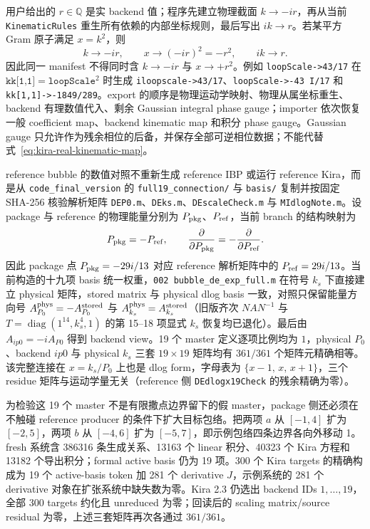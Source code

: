 ﻿\documentclass[a4paper,11pt]{article}
\begin{document}
用户给出的 $r\in\mathbb Q$ 是实 backend 值；程序先建立物理截面 $k\to-ir$，再从当前 \texttt{KinematicRules} 重生所有依赖的内部坐标规则，最后写出 $ik\to r$。若某平方 Gram 原子满足 $x=k^2$，则
\begin{equation}
 k\to-ir,\qquad x\to(-ir)^2=-r^2,\qquad ik\to r.
 \label{eq:kira-dependent-coordinate-section}
\end{equation}
因此同一 manifest 不得同时含 $k\to-ir$ 与 $x\to+r^2$。例如 \texttt{loopScale->43/17} 在 $\texttt{kk[1,1]}=\texttt{loopScale}^2$ 时生成 \texttt{iloopscale->43/17}、\texttt{loopScale->-43 I/17} 和 \texttt{kk[1,1]->-1849/289}。export 的顺序是物理运动学映射、物理从属坐标重生、backend 有理数值代入、剩余 Gaussian integral phase gauge；importer 依次恢复一般 coefficient map、backend kinematic map 和积分 phase gauge。Gaussian gauge 只允许作为残余相位的后备，并保存全部可逆相位数据；不能代替式~\eqref{eq:kira-real-kinematic-map}。

reference bubble 的数值对照不重新生成 reference IBP 或运行 reference Kira，而是从 \texttt{code\_final\_version} 的 \texttt{full19\_connection/} 与 \texttt{basis/} 复制并按固定 SHA-256 核验解析矩阵 \texttt{DEP0.m}、\texttt{DEks.m}、\texttt{DEscaleCheck.m} 与 \texttt{MIdlogNote.m}。设 package 与 reference 的物理能量分别为 $P_{\rm pkg}$、$P_{\rm ref}$，当前 branch 的结构映射为
\begin{equation}
 P_{\rm pkg}=-P_{\rm ref},\qquad
 \frac{\partial}{\partial P_{\rm pkg}}=-\frac{\partial}{\partial P_{\rm ref}}.
\end{equation}
因此 package 点 $P_{\rm pkg}=-29i/13$ 对应 reference 解析矩阵中的 $P_{\rm ref}=29i/13$。当前构造的十九项 basis 统一权重，\texttt{002 bubble\_de\_exp\_full.m} 在符号 $k_s$ 下直接建立 physical 矩阵，stored matrix 与 physical dlog basis 一致，对照只保留能量方向号 $A^{\rm phys}_{P_0}=-A^{\rm stored}_{P_0}$ 与 $A^{\rm phys}_{k_s}=A^{\rm stored}_{k_s}$（旧版齐次 $NAN^{-1}$ 与 $T=\operatorname{diag}(1^{14},k_s^4,1)$ 的第 15--18 项显式 $k_s$ 恢复均已退化）。最后由 $A_{ip0}=-iA_{P0}$ 得到 backend view。19 个 master 定义逐项比例均为 $1$，physical $P_0$、backend $ip0$ 与 physical $k_s$ 三套 $19\times19$ 矩阵均有 $361/361$ 个矩阵元精确相等。该完整连接在 $x=k_s/P_0$ 上也是 dlog form，字母表为 $\{x-1,\,x,\,x+1\}$，三个 residue 矩阵与运动学量无关（reference 侧 \texttt{DEdlogx19Check} 的残余精确为零）。

为检验这 19 个 master 不是有限撒点边界留下的假 master，package 侧还必须在不触碰 reference producer 的条件下扩大目标包络。把两项 $a$ 从 $[-1,4]$ 扩为 $[-2,5]$，两项 $b$ 从 $[-4,6]$ 扩为 $[-5,7]$，即示例包络四条边界各向外移动 1。fresh 系统含 386316 条生成关系、13163 个 linear 积分、40323 个 Kira 方程和 13182 个导出积分；formal active basis 仍为 19 项。300 个 Kira targets 的精确构成为 19 个 active-basis token 加 281 个 derivative $J$，示例系统的 281 个 derivative 对象在扩张系统中缺失数为零。Kira 2.3 仍选出 backend IDs $1,\ldots,19$，全部 300 targets 约化且 unreduced 为零；回读后的 scaling matrix/source residual 为零，上述三套矩阵再次各通过 $361/361$。
\end{document}
